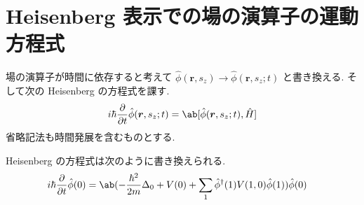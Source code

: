 \documentclass[uplatex,dvipdfmx,a4paper,11pt]{jlreq}
\newcommand{\rr}{\bm{r}}
\numberwithin{equation}{section}
\theoremstyle{definition}
\begin{document}
\section{Heisenberg 表示での場の演算子の運動方程式}
\begin{definition}
  場の演算子が時間に依存すると考えて $\hat{\phi}(\rr, s_z)\to\hat{\phi}(\rr, s_z; t)$ と書き換える.
  そして次の Heisenberg の方程式を課す.
  \begin{align}
    i\hbar\diffp{}{t}\hat{\phi}(\rr, s_z; t) = \ab[\hat{\phi}(\rr, s_z; t), \hat{H}]
  \end{align}
  省略記法も時間発展を含むものとする.
\end{definition}
\begin{theorem}[Q21-95(iii)(iv)(v)(vi)]
  Heisenberg の方程式は次のように書き換えられる.
  \begin{align}
    i\hbar\diffp{}{t}\hat{\phi}(0) & = \ab(-\frac{\hbar^2}{2m}\Delta_0 + V(0) + \sum_{1}\hat{\phi}^\dagger(1)V(1, 0)\hat{\phi}(1))\hat{\phi}(0)
  \end{align}
\end{theorem}
\end{document}
